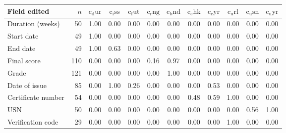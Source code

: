 \begin{tabular}{lrcccccccccc}
\toprule
Field edited & $n$ & $\mathrm{c_dur}$ & $\mathrm{c_iss}$ & $\mathrm{c_fut}$ & $\mathrm{c_rng}$ & $\mathrm{c_bnd}$ & $\mathrm{c_chk}$ & $\mathrm{c_cyr}$ & $\mathrm{c_url}$ & $\mathrm{c_usn}$ & $\mathrm{c_uyr}$\\
\midrule
Duration (weeks) & 50 & 1.00 & 0.00 & 0.00 & 0.00 & 0.00 & 0.00 & 0.00 & 0.00 & 0.00 & 0.00\\
Start date & 49 & 1.00 & 0.00 & 0.00 & 0.00 & 0.00 & 0.00 & 0.00 & 0.00 & 0.00 & 0.00\\
End date & 49 & 1.00 & 0.63 & 0.00 & 0.00 & 0.00 & 0.00 & 0.00 & 0.00 & 0.00 & 0.00\\
Final score & 110 & 0.00 & 0.00 & 0.00 & 0.16 & 0.97 & 0.00 & 0.00 & 0.00 & 0.00 & 0.00\\
Grade & 121 & 0.00 & 0.00 & 0.00 & 0.00 & 1.00 & 0.00 & 0.00 & 0.00 & 0.00 & 0.00\\
Date of issue & 85 & 0.00 & 1.00 & 0.26 & 0.00 & 0.00 & 0.00 & 0.53 & 0.00 & 0.00 & 0.00\\
Certificate number & 54 & 0.00 & 0.00 & 0.00 & 0.00 & 0.00 & 0.48 & 0.59 & 1.00 & 0.00 & 0.00\\
USN & 50 & 0.00 & 0.00 & 0.00 & 0.00 & 0.00 & 0.00 & 0.00 & 0.00 & 0.56 & 1.00\\
Verification code & 29 & 0.00 & 0.00 & 0.00 & 0.00 & 0.00 & 0.00 & 0.00 & 1.00 & 0.00 & 0.00\\
\bottomrule
\end{tabular}
